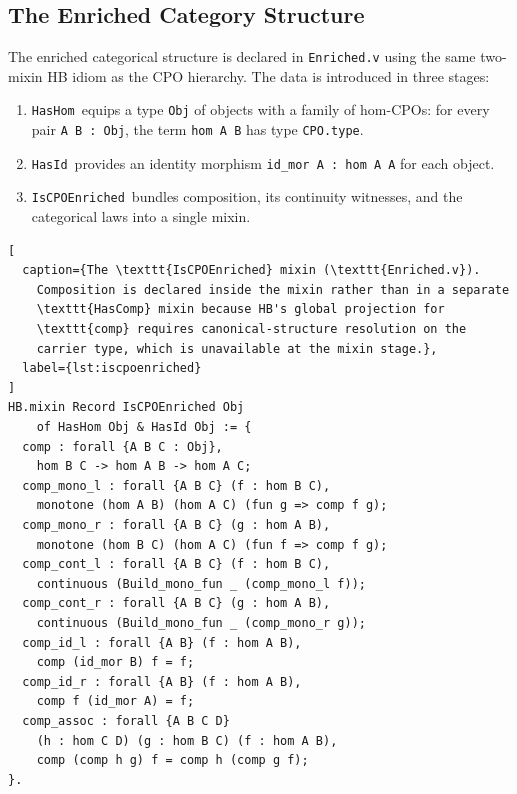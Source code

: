 \subsection{The Enriched Category Structure}
\label{sec:meth-enriched-structure}


The enriched categorical structure is declared in \texttt{Enriched.v}
using the same two-mixin HB idiom as the CPO hierarchy.  The data is
introduced in three stages:

\begin{enumerate}
  \item \texttt{HasHom}~equips a type \texttt{Obj} of objects with a
    family of hom-CPOs: for every pair \texttt{A~B~:~Obj}, the term
    \texttt{hom~A~B} has type \texttt{CPO.type}.
  \item \texttt{HasId}~provides an identity morphism
    \texttt{id\_mor~A~:~hom~A~A} for each object.
  \item \texttt{IsCPOEnriched}~bundles composition, its continuity
    witnesses, and the categorical laws into a single mixin.
\end{enumerate}

\begin{lstlisting}[
  caption={The \texttt{IsCPOEnriched} mixin (\texttt{Enriched.v}).
    Composition is declared inside the mixin rather than in a separate
    \texttt{HasComp} mixin because HB's global projection for
    \texttt{comp} requires canonical-structure resolution on the
    carrier type, which is unavailable at the mixin stage.},
  label={lst:iscpoenriched}
]
HB.mixin Record IsCPOEnriched Obj
    of HasHom Obj & HasId Obj := {
  comp : forall {A B C : Obj},
    hom B C -> hom A B -> hom A C;
  comp_mono_l : forall {A B C} (f : hom B C),
    monotone (hom A B) (hom A C) (fun g => comp f g);
  comp_mono_r : forall {A B C} (g : hom A B),
    monotone (hom B C) (hom A C) (fun f => comp f g);
  comp_cont_l : forall {A B C} (f : hom B C),
    continuous (Build_mono_fun _ (comp_mono_l f));
  comp_cont_r : forall {A B C} (g : hom A B),
    continuous (Build_mono_fun _ (comp_mono_r g));
  comp_id_l : forall {A B} (f : hom A B),
    comp (id_mor B) f = f;
  comp_id_r : forall {A B} (f : hom A B),
    comp f (id_mor A) = f;
  comp_assoc : forall {A B C D}
    (h : hom C D) (g : hom B C) (f : hom A B),
    comp (comp h g) f = comp h (comp g f);
}.
\end{lstlisting}

